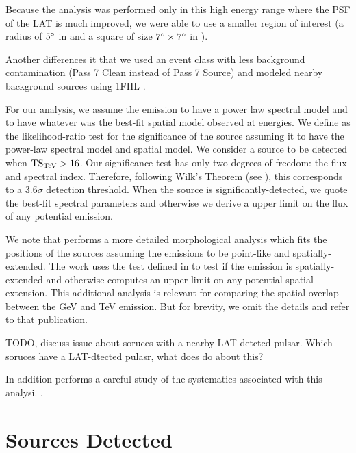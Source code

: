 Because the analysis was performed only in this high energy range where
the \ac{PSF} of the \ac{LAT} is much improved, we were able to use
a smaller region of interest (a radius of $5^\circ$ in \pointlike 
and a square of size $7^\circ\times7^\circ$ in \gtlike).

Another differences it that we used an event class with less background
contamination (Pass 7 Clean instead of Pass 7 Source) and modeled
nearby background sources using \ac{1FHL} \cite{ackermann_2013a_first-fermi-lat}.

For our analysis, we assume the \gev emission to have a power law spectral
model and to have whatever was the best-fit spatial model observed at
\tev energies.  We define \tstev as the likelihood-ratio test for the
significance of the source assuming it to have the power-law spectral
model and \tev spatial model.  We consider a source to be detected when
$\mathrm{TS}_\text{TeV} > 16$.  Our significance test has only two degrees of freedom:
the flux and spectral index.  Therefore, following Wilk's Theorem (see
), this corresponds to a $3.6\sigma$
detection threshold. When the source is significantly-detected, we quote
the best-fit spectral parameters and otherwise we derive a upper limit
on the flux of any potential emission.

We note that \cite{acero_2013a_constraints-galactic} performs a more
detailed morphological analysis which fits the positions of the sources
assuming the emissions to be point-like and spatially-extended.  The work
uses the \tsext test defined in  to test if
the emission is spatially-extended and otherwise computes an upper limit
on any potential spatial extension.  This additional analysis is relevant
for comparing the spatial overlap between the GeV and TeV emission. But
for brevity, we omit the details and refer to that publication.

TODO, discuss issue about soruces with a nearby LAT-detcted pulsar.
Which soruces have a LAT-dtected pulasr, what does 
\cite{acero_2013a_constraints-galactic} do about this?

In addition \cite{acero_2013a_constraints-galactic} performs
a careful study of the systematics associated with this analysi.
.

\section{Sources Detected}


